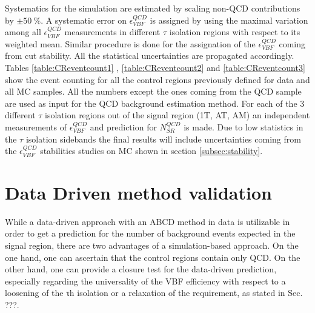 Systematics for the simulation are estimated by scaling non-QCD contributions by $\pm50~\%$. A systematic error on $\epsilon^{QCD}_{VBF}$ is assigned by using the maximal variation among all $\epsilon^{QCD}_{VBF}$ measurements in different $\tau$ isolation regions with respect to its weighted mean. Similar procedure is done for the assignation of the $\epsilon^{QCD}_{VBF}$ coming from \met cut stability. All the statistical uncertainties are propagated accordingly. Tables \ref{table:CReventcount1} , \ref{table:CReventcount2} and \ref{table:CReventcount3} show the event counting for all the control regions previously defined for data and all MC samples. All the numbers except the ones coming from the QCD sample are used as input for the QCD background estimation method. For each of the 3 different $\tau$ isolation regions out of the signal region (1T, AT, AM) an independent measurements of $\epsilon^{QCD}_{VBF}$  and prediction for $N^{QCD}_{SR}$ is made. Due to low statistics in the $\tau$ isolation sidebands the final results will include uncertainties coming from the $\epsilon^{QCD}_{VBF}$ stabilities studies on MC shown in section \ref{subsec:stability}.



\section{Data Driven method validation}
\label{QCD_bg_pred_validation}

While a data-driven approach with an ABCD method in data is utilizable in order to get a prediction for the number of background events expected in the signal region, there are two advantages of a simulation-based approach. On the one hand, one can ascertain that the control regions contain only QCD. On the other hand, one can provide a closure test for the data-driven prediction, especially regarding the universality of the VBF efficiency with respect to a loosening of the τh isolation or a relaxation of the \met requirement, as stated in Sec. ???.

